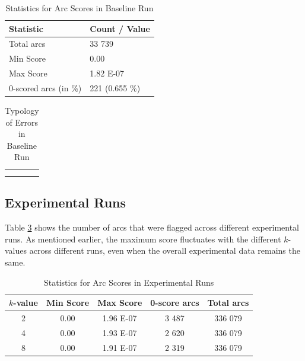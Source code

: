 \begin{table}[H]
    \centering
    \begin{tabular}{|l|l|}
        \hline
        \textbf{Statistic} & \textbf{Count / Value} \\
        \hline
        Total arcs & 33 739\\
        Min Score & 0.00\\
        Max Score & 1.82 E-07\\
        0-scored arcs (in \%) & 221 (0.655 \%)\\
        \hline
    \end{tabular}
    \caption{Statistics for Arc Scores in Baseline Run}
    \label{tab:stats_baseline}
\end{table}

\begin{table}[H]
    \centering
    \begin{tabular}{c|c}
         &  \\
         & 
    \end{tabular}
    \caption{Typology of Errors in Baseline Run}
    \label{tab:my_label}
\end{table}
\subsection{Experimental Runs}
\label{statistics:experiments}

Table \ref{tab:absminmax} shows the number of arcs that were flagged across different experimental runs. As mentioned earlier, the maximum score fluctuates with the different \(k\)-values across different runs, even when the overall experimental data remains the same.

\begin{table}[H]
    \centering
    \begin{tabular}{|c|c|c|c|c|}
    \hline
    \textbf{\(k\)-value} & \textbf{Min Score} & \textbf{Max Score} & \textbf{0-score arcs} & \textbf{Total arcs}\\
    \hline
    \hline
    2 & 0.00 & 1.96 E-07 & 3 487 & 336 079 \\
    4 & 0.00 & 1.93 E-07 & 2 620 & 336 079 \\
    8 & 0.00 & 1.91 E-07 & 2 319 & 336 079 \\
    \hline
    \end{tabular}
    \caption{Statistics for Arc Scores in Experimental Runs}
    \label{tab:absminmax}
\end{table}

